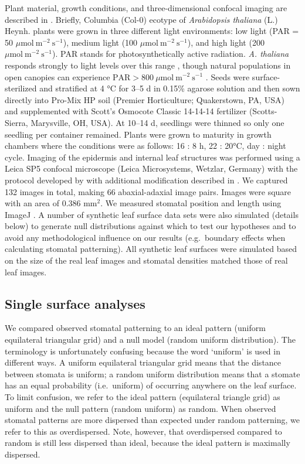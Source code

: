 \documentclass[webpdf,large,modern,unnumsec,namedate]{oup-authoring-template}
\begin{document}
Plant material, growth conditions, and three-dimensional confocal
imaging are described in \citet{dow_disruption_2017}. Briefly, Columbia
(Col-0) ecotype of \emph{Arabidopsis thaliana} (L.) Heynh. plants were
grown in three different light environments: low light (PAR = 50
\(\mu \text{mol}~\text{m}^{-2}~\text{s}^{-1}\)), medium light (100
\(\mu \text{mol}~\text{m}^{-2}~\text{s}^{-1}\)), and high light (200
\(\mu \text{mol}~\text{m}^{-2}~\text{s}^{-1}\)). PAR stands for
photosynthetically active radiation. \emph{A. thaliana} responds
strongly to light levels over this range
\citep{bailey_acclimation_2001}, though natural populations in open
canopies can experience
\(\text{PAR} > 800~\mu \text{mol}~\text{m}^{-2}~\text{s}^{-1}\)
\citep{callahan_shade-induced_2002}. Seeds were surface-sterilized and
stratified at 4 °C for 3--5 d in 0.15\% agarose solution and then sown
directly into Pro-Mix HP soil (Premier Horticulture; Quakerstown, PA,
USA) and supplemented with Scott's Osmocote Classic 14-14-14 fertilizer
(Scotts-Sierra, Marysville, OH, USA). At 10--14 d, seedlings were
thinned so only one seedling per container remained. Plants were grown
to maturity in growth chambers where the conditions were as follows: 16
: 8 h, 22 : 20°C, day : night cycle. Imaging of the epidermis and
internal leaf structures was performed using a Leica SP5 confocal
microscope (Leica Microsystems, Wetzlar, Germany) with the protocol
developed by \citet{wuyts_high-contrast_2010} with additional
modification described in \citet{dow_disruption_2017}. We captured 132
images in total, making 66 abaxial-adaxial image pairs. Images were
square with an area of 0.386 mm\(^2\). We measured stomatal position and
length using ImageJ \citep{schneider_nih_2012}. A number of synthetic
leaf surface data sets were also simulated (details below) to generate
null distributions against which to test our hypotheses and to avoid any
methodological influence on our results (e.g.~boundary effects when
calculating stomatal patterning). All synthetic leaf surfaces were
simulated based on the size of the real leaf images and stomatal
densities matched those of real leaf images.

\subsection{Single surface analyses}\label{single-surface-analyses}

We compared observed stomatal patterning to an ideal pattern (uniform
equilateral triangular grid) and a null model (random uniform
distribution). The terminology is unfortunately confusing because the
word `uniform' is used in different ways. A uniform equilateral
triangular grid means that the distance between stomata is uniform; a
random uniform distribution means that a stomate has an equal
probability (i.e.~uniform) of occurring anywhere on the leaf surface. To
limit confusion, we refer to the ideal pattern (equilateral triangle
grid) as uniform and the null pattern (random uniform) as random. When
observed stomatal patterns are more dispersed than expected under random
patterning, we refer to this as overdispersed. Note, however, that
overdispersed compared to random is still less dispersed than ideal,
because the ideal pattern is maximally dispersed.
\end{document}
